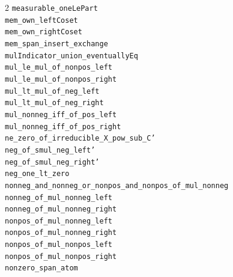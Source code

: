 \documentclass[10pt,a4paper]{article}
\begin{document}
\begin{multicols}{2}
\texttt{measurable\_oneLePart} \\
\texttt{mem\_own\_leftCoset} \\
\texttt{mem\_own\_rightCoset} \\
\texttt{mem\_span\_insert\_exchange} \\
\texttt{mulIndicator\_union\_eventuallyEq} \\
\texttt{mul\_le\_mul\_of\_nonpos\_left} \\
\texttt{mul\_le\_mul\_of\_nonpos\_right} \\
\texttt{mul\_lt\_mul\_of\_neg\_left} \\
\texttt{mul\_lt\_mul\_of\_neg\_right} \\
\texttt{mul\_nonneg\_iff\_of\_pos\_left} \\
\texttt{mul\_nonneg\_iff\_of\_pos\_right} \\
\texttt{ne\_zero\_of\_irreducible\_X\_pow\_sub\_C'} \\
\texttt{neg\_of\_smul\_neg\_left'} \\
\texttt{neg\_of\_smul\_neg\_right'} \\
\texttt{neg\_one\_lt\_zero} \\
\texttt{nonneg\_and\_nonneg\_or\_nonpos\_and\_nonpos\_of\_mul\_nonneg} \\
\texttt{nonneg\_of\_mul\_nonneg\_left} \\
\texttt{nonneg\_of\_mul\_nonneg\_right} \\
\texttt{nonpos\_of\_mul\_nonneg\_left} \\
\texttt{nonpos\_of\_mul\_nonneg\_right} \\
\texttt{nonpos\_of\_mul\_nonpos\_left} \\
\texttt{nonpos\_of\_mul\_nonpos\_right} \\
\texttt{nonzero\_span\_atom} \\

\end{multicols}
\end{document}
